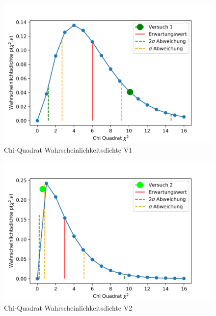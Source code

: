 \begin{figure}[!ht]
	\centering								 
	\includegraphics[width=350pt]{fotos/gpr1/Chi-Quadrat Wahrscheinlichkeitsdichte V1.png}			 
	\caption{Chi-Quadrat Wahrscheinlichkeitsdichte V1}							 
	\label{Chi-Quadrat Wahrscheinlichkeitsdichte V1}							 
\end{figure}
\newpage
\begin{figure}[!ht]
	\centering								 
	\includegraphics[width=350pt]{fotos/gpr1/Chi-Quadrat Wahrscheinlichkeitsdichte V2.png}			 
	\caption{Chi-Quadrat Wahrscheinlichkeitsdichte V2}							 
	\label{Chi-Quadrat Wahrscheinlichkeitsdichte V2}							 
\end{figure}
